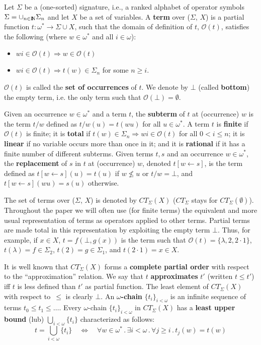 \documentclass{eptcs}
\theoremstyle{plain}
\theoremstyle{definition}
\newcommand{\nat}{{\rm I\!l\!\!N}}
\begin{document}
Let $\Sigma$ be a (one-sorted) signature, i.e., a ranked alphabet of 
operator
symbols $\Sigma = \cup_{n\in\nat}\Sigma_n$ and let $X$ be a set of
variables. 
A {\bf term} over ($\Sigma$,
$X$) is a partial function $t: \omega^* \rightarrow\Sigma\cup X$,
such that the
domain of definition of $t$, $\mathcal{O}(t)$, satisfies the following 
(where $w \in\omega^*$ and all $i \in\omega$):
\begin{itemize}
\item $wi \in\mathcal{O}(t) \Rightarrow w \in\mathcal{O}(t)$

\item $wi \in\mathcal{O}(t) \Rightarrow t(w) \in\Sigma_n$
for some $n \ge i$.
\end{itemize}

$\mathcal{O}(t)$ is called the {\bf set of occurrences} of 
$t$. 
We denote by $\bot$ (called {\bf bottom}) the empty term, i.e. the 
only term such that $\mathcal{O(\bot)} = \emptyset.$


Given an occurrence $w \in\omega^*$ and a term $t$, the {\bf subterm}  
of $t$ at (occurrence) $w$
is the term
$t / w$ defined as $t / w(u) = t(wu)$ for all $u \in\omega^*$.
A term $t$ is {\bf finite\/} if $\mathcal{O}(t)$ is finite; 
it  is {\bf
total\/} if $t(w) \in\Sigma_n\Rightarrow wi \in
\mathcal{O}(t)$ for all $0 < i \le n$;
it is {\bf linear} if no variable occurs more than once in it;
and it is {\bf rational} if it has a finite number of different
subterms.
Given terms $t, s$ and an occurrence $w \in\omega^*$, the {\bf
replacement} of $s$ in $t$ at (occurrence) $w$,
denoted $t[w \leftarrow
s]$, is the term defined as $t[w \leftarrow s](u) = t(u)$ if $w
\not\le u$ or $t / w = \bot$, and $t[w \leftarrow s](wu) = s(u)$
otherwise.  

The set of terms over ($\Sigma$, $X$) is denoted by
$CT_\Sigma(X)$ ($CT_\Sigma$ stays for
$CT_\Sigma(\emptyset)$).
Throughout the paper we will often use (for finite terms) the
equivalent and more usual representation of terms as operators applied
to other terms. Partial terms are made total in this representation by
exploiting the empty term $\bot$. Thus, for example, if $x \in X$, $t = f(\bot,g(x))$
is the term such that $\mathcal{O}(t) = \{\lambda, 2, 2\cdot 1\}$, 
$t(\lambda)
= f \in\Sigma_2$, $t(2) = g \in\Sigma_1$, and $t(2\cdot 1)
= x \in X$.





It is well known that $CT_\Sigma(X)$ forms a {\bf complete partial 
order} 
with respect to the ``approximation'' relation. We say that $t$ {\bf 
approximates} $t'$ (written $t \leq t'$) iff $t$ is less defined than     
$t'$ as partial function.
The least element of $CT_\Sigma(X)$ with respect to\ $\le$ is clearly 
$\bot$. An {\bf $\omega$-chain}
$\{t_i\}_{i<\omega}$ is an infinite sequence of terms
$t_0\le t_1 \le \ldots$. Every $\omega$-chain
$\{t_i\}_{i<\omega}$ in $CT_\Sigma(X)$ has a {\bf least
upper bound} (lub) $\bigcup_{i<\omega}\{t_i\}$ characterized as
follows:
\[t = \bigcup_{i<\omega}\{t_i\} \quad \Leftrightarrow \quad \forall w
\in \omega^*\,.\, \exists i < \omega \,.\, \forall j
\ge i\,.\, t_j(w) = t(w)\]
\end{document}
